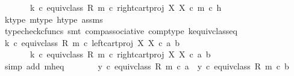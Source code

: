 \begin{isabellebody}
\ \ \ \ \ \ \ {\isacharparenleft}{\kern0pt}k\ {\isasymcirc}\isactrlsub c\ equiv{\isacharunderscore}{\kern0pt}class\ {\isacharparenleft}{\kern0pt}R{\isacharcomma}{\kern0pt}\ m{\isacharparenright}{\kern0pt}{\isacharparenright}{\kern0pt}\ {\isasymcirc}\isactrlsub c\ right{\isacharunderscore}{\kern0pt}cart{\isacharunderscore}{\kern0pt}proj\ X\ X\ {\isasymcirc}\isactrlsub c\ m\ {\isasymcirc}\isactrlsub c\ h{\isachardoublequoteclose}\isanewline
\ \ \ \ \ \ \isamarkupfalse%
\ k{\isacharunderscore}{\kern0pt}type\ m{\isacharunderscore}{\kern0pt}type\ h{\isacharunderscore}{\kern0pt}type\ assms\ \isanewline
\ \ \ \ \ \ \isamarkupfalse%
\ {\isacharparenleft}{\kern0pt}typecheck{\isacharunderscore}{\kern0pt}cfuncs{\isacharcomma}{\kern0pt}\ smt\ comp{\isacharunderscore}{\kern0pt}associative{}\ comp{\isacharunderscore}{\kern0pt}type\ k{\isacharunderscore}{\kern0pt}equiv{\isacharunderscore}{\kern0pt}class{\isacharunderscore}{\kern0pt}eq{\isacharparenright}{\kern0pt}\isanewline
\ \ \ \ \isamarkupfalse%
\ \isamarkupfalse%
\ {\isachardoublequoteopen}{\isacharparenleft}{\kern0pt}k\ {\isasymcirc}\isactrlsub c\ equiv{\isacharunderscore}{\kern0pt}class\ {\isacharparenleft}{\kern0pt}R{\isacharcomma}{\kern0pt}\ m{\isacharparenright}{\kern0pt}{\isacharparenright}{\kern0pt}\ {\isasymcirc}\isactrlsub c\ left{\isacharunderscore}{\kern0pt}cart{\isacharunderscore}{\kern0pt}proj\ X\ X\ {\isasymcirc}\isactrlsub c\ {\isasymlangle}a{\isacharcomma}{\kern0pt}\ b{\isasymrangle}\ {\isacharequal}{\kern0pt}\isanewline
\ \ \ \ \ \ \ {\isacharparenleft}{\kern0pt}k\ {\isasymcirc}\isactrlsub c\ equiv{\isacharunderscore}{\kern0pt}class\ {\isacharparenleft}{\kern0pt}R{\isacharcomma}{\kern0pt}\ m{\isacharparenright}{\kern0pt}{\isacharparenright}{\kern0pt}\ {\isasymcirc}\isactrlsub c\ right{\isacharunderscore}{\kern0pt}cart{\isacharunderscore}{\kern0pt}proj\ X\ X\ {\isasymcirc}\isactrlsub c\ {\isasymlangle}a{\isacharcomma}{\kern0pt}\ b{\isasymrangle}{\isachardoublequoteclose}\isanewline
\ \ \ \ \ \ \isamarkupfalse%
\ {\isacharparenleft}{\kern0pt}simp\ add{\isacharcolon}{\kern0pt}\ m{\isacharunderscore}{\kern0pt}h{\isacharunderscore}{\kern0pt}eq{\isacharparenright}{\kern0pt}\isanewline
\ \ \ \ \isamarkupfalse%
\ \isamarkupfalse%
\ {\isachardoublequoteopen}{\isacharparenleft}{\kern0pt}y\ {\isasymcirc}\isactrlsub c\ equiv{\isacharunderscore}{\kern0pt}class\ {\isacharparenleft}{\kern0pt}R{\isacharcomma}{\kern0pt}\ m{\isacharparenright}{\kern0pt}{\isacharparenright}{\kern0pt}\ {\isasymcirc}\isactrlsub c\ a\ {\isacharequal}{\kern0pt}\ {\isacharparenleft}{\kern0pt}y\ {\isasymcirc}\isactrlsub c\ equiv{\isacharunderscore}{\kern0pt}class\ {\isacharparenleft}{\kern0pt}R{\isacharcomma}{\kern0pt}\ m{\isacharparenright}{\kern0pt}{\isacharparenright}{\kern0pt}\ {\isasymcirc}\isactrlsub c\ b{\isachardoublequoteclose}\isanewline

\end{isabellebody}
